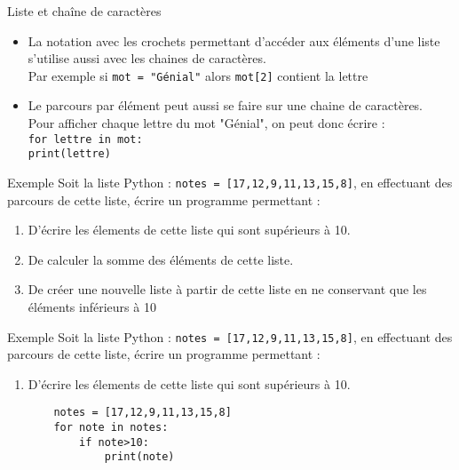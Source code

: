 \documentclass[10pt]{beamer}
\begin{document}
\begin{frame}
	\mframe{\Python}
	\begin{block}{Liste et chaîne de caractères}
		\begin{itemize}[label=\textbullet]
			\item<1-> La notation avec les crochets permettant d'accéder aux éléments d'une liste s'utilise aussi avec les chaines de caractères. \\
			      \onslide<2-> Par exemple si {\tt mot = "Génial"} alors {\tt mot[2]} contient la lettre \onslide<3->{"n"}
			\item<4-> Le parcours par élément peut aussi se faire sur une chaine de caractères. \\
			      \onslide<5-> Pour afficher chaque lettre du mot "Génial", on peut donc écrire : \\
			      \onslide<6-> {\tt for lettre in mot:} \\
			      \onslide<7-> {\tt \qquad    print(lettre)}
		\end{itemize}
	\end{block}
\end{frame}


\begin{frame}
	\mframe{\Python}
	\begin{exampleblock}{Exemple}
		Soit la liste Python : {\tt notes = [17,12,9,11,13,15,8]}, en effectuant des parcours de cette liste, écrire un programme permettant :
		\begin{enumerate}[label=\textbullet]
			\item<1-> D'écrire les élements de cette liste qui sont supérieurs à 10.
			\item<2-> De calculer la somme des éléments de cette liste.
			\item<3-> De créer une nouvelle liste à partir de cette liste en ne conservant que les éléments inférieurs à 10
		\end{enumerate}
	\end{exampleblock}
\end{frame}


\begin{frame}[fragile]
	\mframe{\Python}
	\begin{exampleblock}{Exemple}
		Soit la liste Python : {\tt notes = [17,12,9,11,13,15,8]}, en effectuant des parcours de cette liste, écrire un programme permettant :
		\begin{enumerate}[label=\textbullet]
			\item D'écrire les élements de cette liste qui sont supérieurs à 10.
			      \begin{lstlisting}
	notes = [17,12,9,11,13,15,8]
	for note in notes:
		if note>10:
			print(note)  
\end{lstlisting}
		\end{enumerate}
	\end{exampleblock}
\end{frame}
\end{document}
